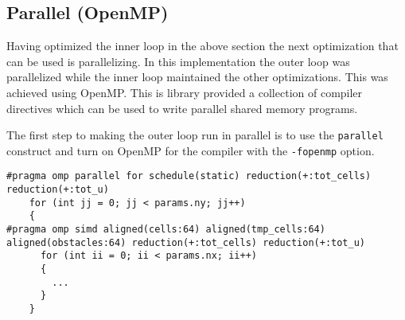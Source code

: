 \documentclass{article}
\begin{document}
\begin{multicols}{2}
\section{Parallel (OpenMP)}

Having optimized the inner loop in the above section the next optimization that
can be used is parallelizing. In this implementation the outer loop was
parallelized while the inner loop maintained the other optimizations. This was
achieved using OpenMP. This is library provided a collection of compiler
directives which can be used to write parallel shared memory programs.

The first step to making the outer loop run in parallel is to use the
\verb|parallel| construct and turn on OpenMP for the compiler with the
\verb|-fopenmp| option.

\begin{lstlisting}[style=CStyle, label={lst:ompparallelloop}, caption={TODO},]
#pragma omp parallel for schedule(static) reduction(+:tot_cells) reduction(+:tot_u)
    for (int jj = 0; jj < params.ny; jj++)
    {    
#pragma omp simd aligned(cells:64) aligned(tmp_cells:64) aligned(obstacles:64) reduction(+:tot_cells) reduction(+:tot_u)
      for (int ii = 0; ii < params.nx; ii++)
      {
        ...
      }
    }
\end{lstlisting}



\end{multicols}
\end{document}
